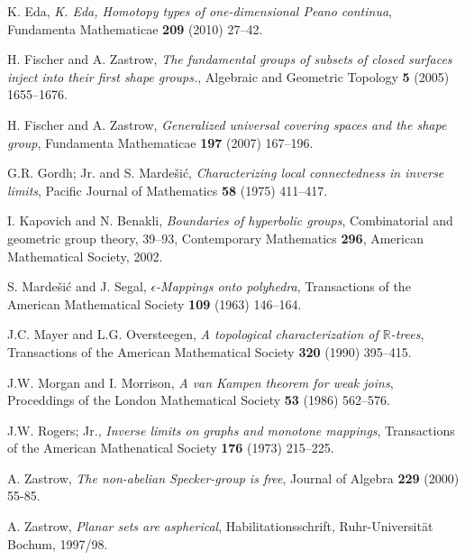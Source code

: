 \documentclass{amsart}
\theoremstyle{definition}
\theoremstyle{remark}
\numberwithin{equation}{section}
\begin{document}
\begin{thebibliography}{00}
 K. Eda, {\em K. Eda, Homotopy types of one-dimensional Peano continua}, Fundamenta Mathematicae {\bf 209} (2010) 27--42.

 H. Fischer and A. Zastrow, {\em  The fundamental groups of subsets of closed surfaces inject into their first shape groups.}, Algebraic and    Geometric Topology {\bf 5} (2005) 1655--1676.

  H. Fischer and A. Zastrow, {\em Generalized universal covering spaces and the shape group},  Fundamenta Mathematicae {\bf 197} (2007) 167--196.

 G.R. Gordh; Jr. and S. Marde\v{s}i\'c,  {\em Characterizing local connectedness in inverse limits}, Pacific Journal of Mathematics {\bf 58} (1975) 411--417.

 I. Kapovich and N. Benakli, {\em Boundaries of hyperbolic groups}, Combinatorial and geometric group theory, 39--93, Contemporary Mathematics {\bf 296}, American  Mathematical Society, 2002.

 S. Marde\v{s}i\'c and J. Segal, {\em $\epsilon$-Mappings onto polyhedra}, Transactions of the American Mathematical Society {\bf 109} (1963) 146--164.

 J.C. Mayer and L.G. Oversteegen, {\em A topological characterization of $\mathbb{R}$-trees},  Transactions of the American Mathematical Society  {\bf 320} (1990) 395--415.

 J.W. Morgan and I. Morrison, {\em A van Kampen theorem for weak joins}, Proceddings of the London Mathematical Society {\bf 53} (1986) 562--576.

 J.W. Rogers; Jr., {\em Inverse limits on graphs and monotone mappings}, Transactions of the American Mathenatical Society {\bf 176} (1973) 215--225.

 A. Zastrow, {\em The non-abelian Specker-group is free}, Journal of Algebra {\bf 229} (2000) 55-85.

      A. Zastrow, {\em Planar sets are aspherical}, Habilitationsschrift,
Ruhr-Universit\"at Bochum, 1997/98.
\end{thebibliography}
\end{document}
